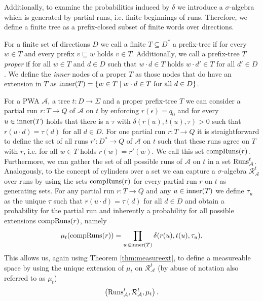 Additionally, to examine the probabilities induced by $\delta$ we introduce a
$\sigma$-algebra which is generated by partial runs, i.e. finite beginnings of
runs. Therefore, we define a finite tree as a prefix-closed subset of finite
words over directions.
\begin{definition}
  For a finite set of directions $D$ we call a finite $T\subseteq D^{*}$ a
  prefix-tree if for every $w\in T$ and every prefix $v\sqsubseteq w$ holds 
  $v\in T$. Additionally, we call a prefix-tree $T$ \emph{proper} if for all 
  $w\in T$ and $d\in D$ such that $w\cdot d\in T$ holds $w\cdot d'\in T$ for 
  all $d'\in D$. We define the \emph{inner} nodes of a proper $T$ as those
  nodes that do have an extension in $T$ as
  $\operatorname{inner}(T) = \left\{w\in T\mid w\cdot d\in T\text{ for all }d\in D\right\}$.
\end{definition}
For a \ac{PWA} $\mathcal{A}$, a tree $t:D\rightarrow\Sigma$ and a proper 
prefix-tree $T$ we can consider a partial run $r:T\rightarrow Q$ of 
$\mathcal{A}$ on $t$ by enforcing $r(\epsilon) = q_{0}$ and for every 
$u\in\operatorname{inner}(T)$ holds that there is a $\tau$ with $\delta(r(u), t(u), \tau)>0$
such that $r(u\cdot d) = \tau(d)$ for all $d\in D$. For one partial run 
$r:T\rightarrow Q$ it is straightforward to define the set of all runs 
$r':D^{*}\rightarrow Q$ of $\mathcal{A}$ on $t$ such that these runs agree on 
$T$ with $r$, i.e. for all $w\in T$ holds $r(w) = r'(w)$. We call this set 
$\operatorname{compRuns}(r)$. Furthermore, we can gather the set of all possible runs of 
$\mathcal{A}$ on $t$ in a set $\operatorname{Runs}_{\mathcal{A}}^{t}$. Analogously, to the 
concept of cylinders over a set we can capture a $\sigma$-algebra 
$\mathcal{R}_{\mathcal{A}}^{t}$ over runs by using the sets $\operatorname{compRuns}(r)$ for 
every partial run $r$ on $t$ as generating sets. For any partial run 
$r:T\rightarrow Q$ and any $u\in\operatorname{inner}(T)$ we define $\tau_{u}$ as the unique 
$\tau$ such that $r(u\cdot d) = \tau(d)$ for all $d\in D$ and obtain a 
probability for the partial run and inherently a probability for all possible
extensions $\operatorname{compRuns}(r)$, namely
\begin{equation*}
  \mu_{t}(\operatorname{compRuns}(r)) = \prod\limits_{w\in\operatorname{inner}(T)}
    \delta(r(u),t(u),\tau_{u}).
\end{equation*}
This allows us, again using Theorem \ref{thm:measureext}, to define a 
measureable space by using the unique extension of $\mu_{t}$ on 
$\mathcal{R}_{\mathcal{A}}^{t}$ (by abuse of notation also referred to as 
$\mu_{t}$)
\begin{equation*}
  \left(\operatorname{Runs}_{\mathcal{A}}^{t}, \mathcal{R}_{\mathcal{A}}^{t}, \mu_{t}\right).
\end{equation*}
